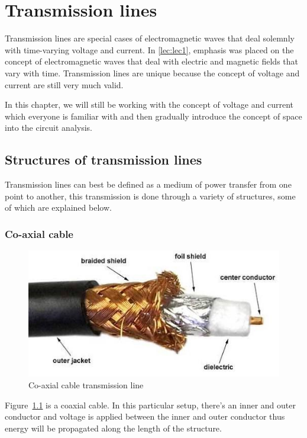 \chapter{Transmission lines}\label{lec:lec2}
Transmission lines are special cases of electromagnetic waves that deal solemnly with time-varying voltage and current. In \autoref{lec:lec1}, emphasis was placed on the concept of electromagnetic waves that deal with electric and magnetic fields that vary with time. Transmission lines are unique because the concept of voltage and current are still very much valid.

In this chapter, we will still be working with the concept of voltage and current which everyone is familiar with and then gradually introduce the concept of space into the circuit analysis. 

\section{Structures of transmission lines}
Transmission lines can best be defined as a medium of power transfer from one point to another, this transmission is done through a variety of structures, some of which are explained below.

\subsection{Co-axial cable}	
\begin{figure}[h]
\centering
\includegraphics[scale=0.65]{./graphics/coaxial}
\caption{Co-axial cable transmission line}
\label{fig:coaxial}
\end{figure}

Figure~\ref{fig:coaxial} is a coaxial cable. In this particular setup, there’s an inner and outer conductor and voltage is applied between the inner and outer conductor thus energy will be propagated along the length of the structure.

